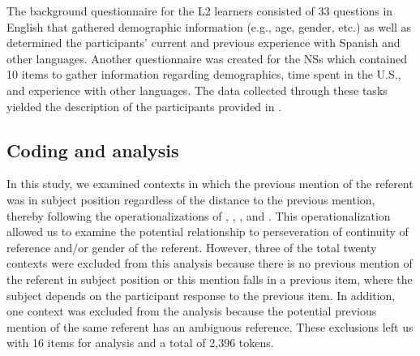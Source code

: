 \documentclass[output=paper]{langscibook}
\begin{document}
The background questionnaire for the L2 learners consisted of 33 questions in English that gathered demographic information (e.g., age, gender, etc.) as well as determined the participants’ current and previous experience with Spanish and other languages. Another questionnaire was created for the NSs which contained 10 items to gather information regarding demographics, time spent in the U.S., and experience with other languages. The data collected through these tasks yielded the description of the participants provided in .


\subsection{Coding and analysis}\label{sec:geeslin:5.3}



In this study, we examined contexts in which the previous mention of the referent was in subject position regardless of the distance to the previous mention, thereby following the operationalizations of \citet{Abreu2012}, \citet{Flores-Ferrán2002}, \citet{GeeslinGudmestad2011}, and \citet{Travis2007}. This operationalization allowed us to examine the potential relationship to perseveration of continuity of reference and/or gender of the referent. However, three of the total twenty contexts were excluded from this analysis because there is no previous mention of the referent in subject position or this mention falls in a previous item, where the subject depends on the participant response to the previous item. In addition, one context was excluded from the analysis because the potential previous mention of the same referent has an ambiguous reference. These exclusions left us with 16 items for analysis and a total of 2,396 tokens.  
\end{document}
